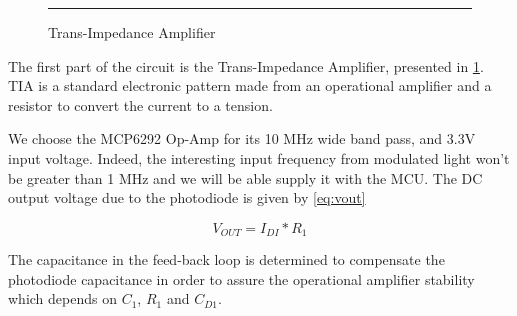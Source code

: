 \begin{figure}[htbp]
    \centering
    \rule{35em}{0.5pt}    
    \caption{Trans-Impedance Amplifier}
    \label{fig:tia}
\end{figure}

The first part of the circuit is the Trans-Impedance Amplifier, presented in \ref{fig:tia}. TIA is a standard electronic pattern made from an operational amplifier and a resistor to convert the current to a tension.

We choose the MCP6292 Op-Amp for its 10 MHz wide band pass, and 3.3V input voltage. Indeed, the interesting input frequency  from modulated light won't be greater than 1 MHz and we will be able supply it with the MCU.
The DC output voltage due to the photodiode is given by \ref{eq:vout} 

\begin{equation}
V_{OUT}  = I_{DI} * R_{1}
\label{eq:vout}
\end{equation}

The capacitance in the feed-back loop is determined to compensate the photodiode capacitance in order to assure the operational amplifier stability which depends on $C_1$, $R_1$ and $C_{D1}$.

